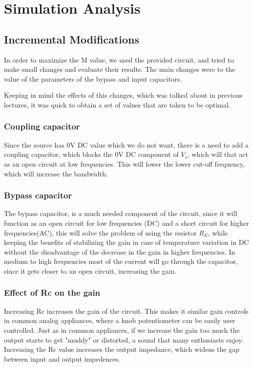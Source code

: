\section{Simulation Analysis}
\label{sec:simulation analysis}
\subsection{Incremental Modifications}

\indent

In order to maximize the M value, we used the provided circuit, and tried to make small changes and evaluate their results. The main changes were to the value of the parameters of the bypass and input capacitors.

Keeping in mind the effects of this changes, which was talked about in previous lectures, it was quick to obtain a set of values that are taken to be optimal.
\subsubsection{Coupling capacitor}
Since the source has 0V DC value which we do not want, there is a need to add a coupling capacitor, which blocks the 0V DC component of $V_s$, which will that act as an open circuit at low frequencies. This will lower the lower cut-off frequency, which will increase the bandwidth.

\subsubsection{Bypass capacitor}
The bypass capacitor, is a much needed component of the circuit, since it will function as an open circuit for low frequencies (DC) and a short circuit for higher frequencies(AC), this will solve the problem of using the resistor $R_E$, while keeping the benefits of stabilizing the gain in case of temperature variation in DC without the disadvantage of the decrease in the gain in higher frequencies. In medium to high frequencies most of the current will go through the capacitor, since it gets closer to an open circuit, increasing the gain.

\subsubsection{Effect of Rc on the gain}
Increasing Rc increases the gain of the circuit. This makes it similar gain controls in common analog appliances, where a knob potentiometer can be easily user controlled. Just as in common appliances, if we increase the gain too much the output starts to get "muddy" or distorted, a sound that many enthusiasts enjoy. Increasing the Rc value increases the output impedance, which widens the gap between input and output impedences.

